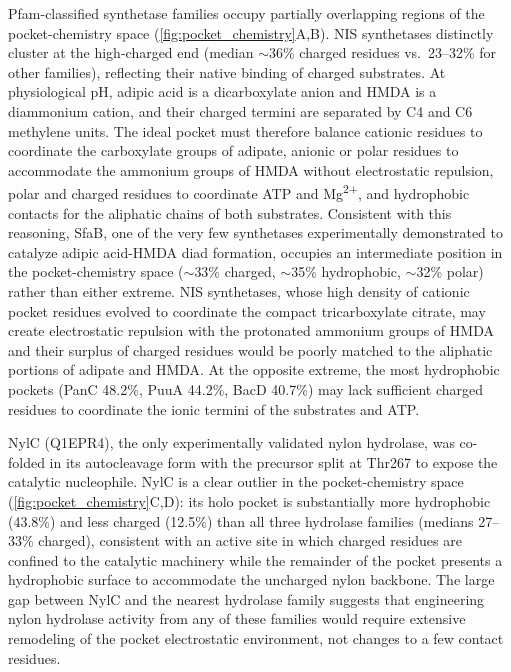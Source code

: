 \documentclass[12pt]{article}
\begin{document}
Pfam-classified synthetase families occupy partially overlapping regions of the pocket-chemistry space (\autoref{fig:pocket_chemistry}A,B). NIS synthetases distinctly cluster at the high-charged end (median $\sim$36\% charged residues vs.\ 23--32\% for other families), reflecting their native binding of charged substrates. At physiological pH, adipic acid is a dicarboxylate anion and HMDA is a diammonium cation, and their charged termini are separated by C4 and C6 methylene units. The ideal pocket must therefore balance cationic residues to coordinate the carboxylate groups of adipate, anionic or polar residues to accommodate the ammonium groups of HMDA without electrostatic repulsion, polar and charged residues to coordinate ATP and Mg\textsuperscript{2+}, and hydrophobic contacts for the aliphatic chains of both substrates. Consistent with this reasoning, SfaB, one of the very few synthetases experimentally demonstrated to catalyze adipic acid-HMDA diad formation\cite{qian2025nylon}, occupies an intermediate position in the pocket-chemistry space ($\sim$33\% charged, $\sim$35\% hydrophobic, $\sim$32\% polar) rather than either extreme. NIS synthetases, whose high density of cationic pocket residues evolved to coordinate the compact tricarboxylate citrate, may create electrostatic repulsion with the protonated ammonium groups of HMDA and their surplus of charged residues would be poorly matched to the aliphatic portions of adipate and HMDA. At the opposite extreme, the most hydrophobic pockets (PanC 48.2\%, PuuA 44.2\%, BacD 40.7\%) may lack sufficient charged residues to coordinate the ionic termini of the substrates and ATP. 

NylC (Q1EPR4), the only experimentally validated nylon hydrolase, was co-folded in its autocleavage form with the precursor split at Thr267 to expose the catalytic nucleophile. NylC is a clear outlier in the pocket-chemistry space (\autoref{fig:pocket_chemistry}C,D): its holo pocket is substantially more hydrophobic (43.8\%) and less charged (12.5\%) than all three hydrolase families (medians 27--33\% charged), consistent with an active site in which charged residues are confined to the catalytic machinery while the remainder of the pocket presents a hydrophobic surface to accommodate the uncharged nylon backbone. The large gap between NylC and the nearest hydrolase family suggests that engineering nylon hydrolase activity from any of these families would require extensive remodeling of the pocket electrostatic environment, not changes to a few contact residues.
\end{document}
